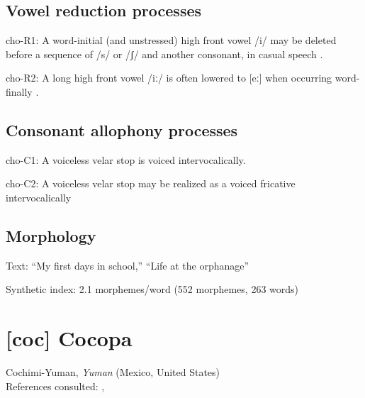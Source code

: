 {\subsection*{Vowel reduction processes}
\begin{appendixdesc}

\item[cho-R1:] A word-initial (and unstressed) high front vowel /i/ may be deleted before a sequence of /s/ or /ʃ/ and another consonant, in casual speech \citep[19]{Broadwell2006}.

\item[cho-R2:] A long high front vowel /iː/ is often lowered to [eː] when occurring word-finally \citep[30]{Broadwell2006}.
\end{appendixdesc}
\subsection*{Consonant allophony processes}
\begin{appendixdesc}

\item[cho-C1:] A voiceless velar stop is voiced intervocalically. \citep[15]{Broadwell2006}

\item[cho-C2:]  A voiceless velar stop may be realized as a voiced fricative intervocalically \citep[15]{Broadwell2006}
\end{appendixdesc}
\subsection*{Morphology}

\begin{appendixdesc}

\item[Text:] “My first days in school,” “Life at the orphanage” \citep[355--360]{Broadwell2006}

\item[Synthetic index:] 2.1 morphemes/word (552 morphemes, 263 words)
\end{appendixdesc}
\section*{[coc] Cocopa}  %
Cochimi-Yuman, \textit{Yuman} (Mexico, United States)\medskip\\
References consulted: \citet{Bendixen1980}, \citet{Crawford1966}

}
